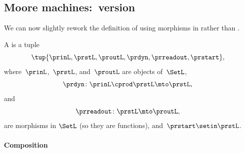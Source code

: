 {%


\subsection{Moore machines:~\SetL version}
We can now slightly rework the definition of  using morphisms in \SetL rather than \Set.
\begin{definition}
    \label{def:moore-machine}
    A  is a tuple
    \begin{equation}
        \label{eq:moore-tuple-improved-again}
        \tup{\prinL,\prstL,\proutL,\prdyn,\prreadout,\prstart},
    \end{equation}
    where~$\prinL$,~$\prstL$, and~$\proutL$ are objects of~$\SetL$,
    \begin{equation}
        \prdyn \colon \prinL \cprod \prstL \mto \prstL,
    \end{equation}
    and
    \begin{equation}
        \prreadout \colon \prstL \mto \proutL,
    \end{equation}
    are morphisms in $\SetL$ (so they are functions),
    and~$\prstart \setin \prstL$.
\end{definition}

\paragraph{Composition}
\label{sec:composition-of-Moore-machines}

}
